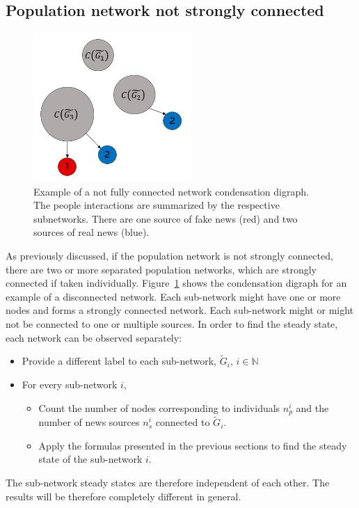 \subsection{Population network not strongly connected}
\begin{figure}[!t]
	\centering
	\includegraphics[width=6cm]{Figures/not_strongly_connected.png}
	\caption{Example of a not fully connected network condensation digraph. The people interactions are summarized by the respective subnetworks. There are one source of fake news (red) and two sources of real news (blue).}
	\label{pics:nonconnectednetwork}
\end{figure}
As previously discussed, if the population network is not strongly connected, there are two or more separated population networks, which are strongly connected if taken individually. Figure~\ref{pics:nonconnectednetwork} shows the condensation digraph for an example of a disconnected network. Each sub-network might have one or more nodes and forms a strongly connected network. Each sub-network might or might not be connected to one or multiple sources. \newline
In order to find the steady state, each network can be observed separately:
\begin{itemize}
	\item 
	Provide a different label to each sub-network, $\tilde{G}_i$, $i \in \mathbb{N}$
	\item 
	For every sub-network $i$,
	\begin{itemize}
		\item 
		Count the number of nodes corresponding to individuals $n_p^i$ and the number of news sources $n_s^i$ connected to $\tilde{G}_i$. 
		\item 
		Apply the formulas presented in the previous sections to find the steady state of the sub-network $i$.
	\end{itemize}
\end{itemize}
The sub-network steady states are therefore independent of each other. The results will be therefore completely different in general. 